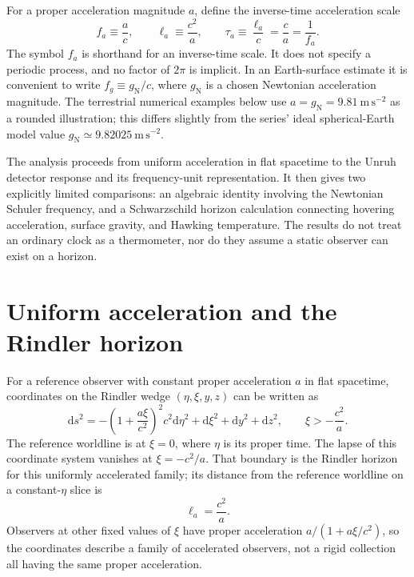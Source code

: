 \documentclass[12pt]{article}
\begin{document}
For a proper acceleration magnitude $a$, define the inverse-time acceleration scale
\begin{equation}
  f_a\equiv\frac{a}{c},
  \qquad
  \ell_a\equiv\frac{c^2}{a},
  \qquad
  \tau_a\equiv\frac{\ell_a}{c}=\frac{c}{a}=\frac{1}{f_a}.
  \label{eq:acceleration-scales}
\end{equation}
The symbol $f_a$ is shorthand for an inverse-time scale. It does not specify a periodic process, and no factor of $2\pi$ is implicit. In an Earth-surface estimate it is convenient to write $f_g\equiv g_{\mathrm{N}}/c$, where $g_{\mathrm{N}}$ is a chosen Newtonian acceleration magnitude.
The terrestrial numerical examples below use $a=g_{\mathrm{N}}=9.81\ \mathrm{m\,s^{-2}}$ as a rounded illustration; this differs slightly from the series' ideal spherical-Earth model value $g_{\mathrm{N}}\simeq9.82025\ \mathrm{m\,s^{-2}}$.

The analysis proceeds from uniform acceleration in flat spacetime to the Unruh detector response and its frequency-unit representation. It then gives two explicitly limited comparisons: an algebraic identity involving the Newtonian Schuler frequency, and a Schwarzschild horizon calculation connecting hovering acceleration, surface gravity, and Hawking temperature. The results do not treat an ordinary clock as a thermometer, nor do they assume a static observer can exist on a horizon.

\section{Uniform acceleration and the Rindler horizon}

For a reference observer with constant proper acceleration $a$ in flat spacetime, coordinates on the Rindler wedge $(\eta,\xi,y,z)$ can be written as \cite{Rindler}
\begin{equation}
  \mathrm{d}s^2
  =-\left(1+\frac{a\xi}{c^2}\right)^2c^2\mathrm{d}\eta^2
   +\mathrm{d}\xi^2+\mathrm{d}y^2+\mathrm{d}z^2,
  \qquad \xi>-\frac{c^2}{a}.
  \label{eq:rindler-metric}
\end{equation}
The reference worldline is at $\xi=0$, where $\eta$ is its proper time. The lapse of this coordinate system vanishes at $\xi=-c^2/a$. That boundary is the Rindler horizon for this uniformly accelerated family; its distance from the reference worldline on a constant-$\eta$ slice is
\begin{equation}
  \ell_a=\frac{c^2}{a}.
  \label{eq:rindler-distance}
\end{equation}
Observers at other fixed values of $\xi$ have proper acceleration $a/(1+a\xi/c^2)$, so the coordinates describe a family of accelerated observers, not a rigid collection all having the same proper acceleration.
\end{document}
